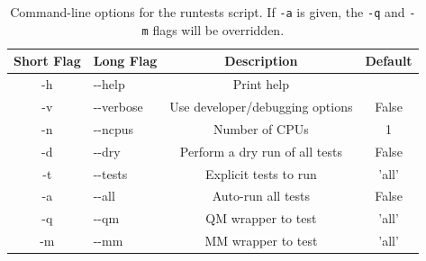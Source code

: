 \documentclass[12pt]{report}
\begin{document}
\begin{table}[hbt]
 \centering
 \begin{tabular}{|c|l|c|c|}
 \hline
 Short Flag & Long Flag   & Description                     & Default\\ \hline
 -h         & -{}-help    & Print help                      & \\
 -v         & -{}-verbose & Use developer/debugging options & False \\
 -n         & -{}-ncpus   & Number of CPUs                  & 1 \\
 -d         & -{}-dry     & Perform a dry run of all tests  & False \\
 -t         & -{}-tests   & Explicit tests to run           & 'all' \\
 -a         & -{}-all     & Auto-run all tests              & False \\
 -q         & -{}-qm      & QM wrapper to test              & 'all' \\
 -m         & -{}-mm      & MM wrapper to test              & 'all' \\
 \hline
 \end{tabular}
 \caption{
 Command-line options for the runtests script. If \texttt{-a} is given, the
 \texttt{-q} and \texttt{-m} flags will be overridden.}
 \label{tab:TestOpts}
\end{table}
\end{document}
